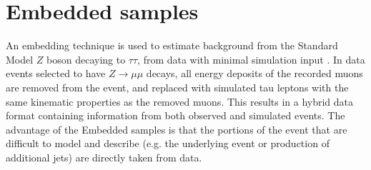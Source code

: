 
\section{Embedded samples}
An embedding technique is used to estimate background from the Standard Model $Z$ boson decaying to $\tau\tau$, from data with minimal simulation input \cite{CMS-TAU-18-001}. In data events selected to have $Z \rightarrow \mu\mu$ decays, all energy deposits of the recorded muons are removed from the event, and replaced with simulated tau leptons with the same kinematic properties as the removed muons. This results in a hybrid data format containing information from both observed and simulated events. The advantage of the Embedded samples is that the portions of the event that are difficult to model and describe (e.g. the underlying event or production of additional jets) are directly taken from data. 

